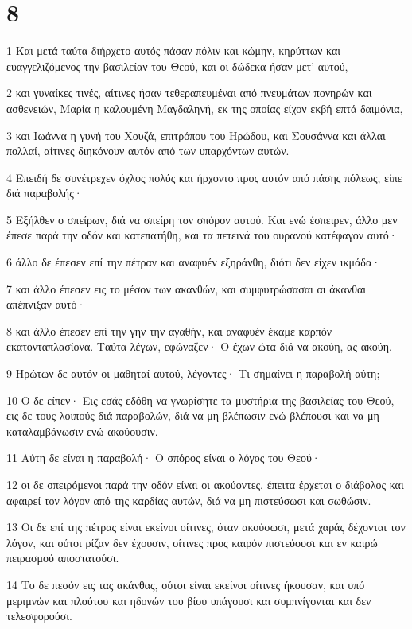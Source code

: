 \chapter{8}

\par 1 Και μετά ταύτα διήρχετο αυτός πάσαν πόλιν και κώμην, κηρύττων και ευαγγελιζόμενος την βασιλείαν του Θεού, και οι δώδεκα ήσαν μετ' αυτού,
\par 2 και γυναίκες τινές, αίτινες ήσαν τεθεραπευμέναι από πνευμάτων πονηρών και ασθενειών, Μαρία η καλουμένη Μαγδαληνή, εκ της οποίας είχον εκβή επτά δαιμόνια,
\par 3 και Ιωάννα η γυνή του Χουζά, επιτρόπου του Ηρώδου, και Σουσάννα και άλλαι πολλαί, αίτινες διηκόνουν αυτόν από των υπαρχόντων αυτών.
\par 4 Επειδή δε συνέτρεχεν όχλος πολύς και ήρχοντο προς αυτόν από πάσης πόλεως, είπε διά παραβολής·
\par 5 Εξήλθεν ο σπείρων, διά να σπείρη τον σπόρον αυτού. Και ενώ έσπειρεν, άλλο μεν έπεσε παρά την οδόν και κατεπατήθη, και τα πετεινά του ουρανού κατέφαγον αυτό·
\par 6 άλλο δε έπεσεν επί την πέτραν και αναφυέν εξηράνθη, διότι δεν είχεν ικμάδα·
\par 7 και άλλο έπεσεν εις το μέσον των ακανθών, και συμφυτρώσασαι αι άκανθαι απέπνιξαν αυτό·
\par 8 και άλλο έπεσεν επί την γην την αγαθήν, και αναφυέν έκαμε καρπόν εκατονταπλασίονα. Ταύτα λέγων, εφώναζεν· Ο έχων ώτα διά να ακούη, ας ακούη.
\par 9 Ηρώτων δε αυτόν οι μαθηταί αυτού, λέγοντες· Τι σημαίνει η παραβολή αύτη;
\par 10 Ο δε είπεν· Εις εσάς εδόθη να γνωρίσητε τα μυστήρια της βασιλείας του Θεού, εις δε τους λοιπούς διά παραβολών, διά να μη βλέπωσιν ενώ βλέπουσι και να μη καταλαμβάνωσιν ενώ ακούουσιν.
\par 11 Αύτη δε είναι η παραβολή· Ο σπόρος είναι ο λόγος του Θεού·
\par 12 οι δε σπειρόμενοι παρά την οδόν είναι οι ακούοντες, έπειτα έρχεται ο διάβολος και αφαιρεί τον λόγον από της καρδίας αυτών, διά να μη πιστεύσωσι και σωθώσιν.
\par 13 Οι δε επί της πέτρας είναι εκείνοι οίτινες, όταν ακούσωσι, μετά χαράς δέχονται τον λόγον, και ούτοι ρίζαν δεν έχουσιν, οίτινες προς καιρόν πιστεύουσι και εν καιρώ πειρασμού αποστατούσι.
\par 14 Το δε πεσόν εις τας ακάνθας, ούτοι είναι εκείνοι οίτινες ήκουσαν, και υπό μεριμνών και πλούτου και ηδονών του βίου υπάγουσι και συμπνίγονται και δεν τελεσφορούσι.
